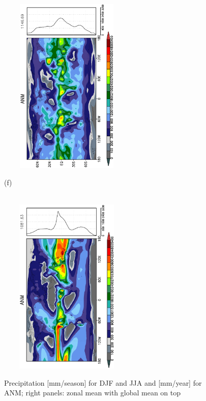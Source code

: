 \documentclass[12pt,a4paper,twoside,openright,headinclude,liststotoc,bibtotoc]{scrreprt}
\begin{document}
\begin{figure}[H]
{\includegraphics[height=8.5cm,width=6.5cm,angle=-90]
{eps/zonaltmtotalprec260.eps}
}
\parbox{8.5cm}{\hspace{0.45cm}\begin{scriptsize}(f)\end{scriptsize} \vspace{-0.7cm} \\
\includegraphics[height=8.5cm,width=6.5cm,angle=-90]
{eps/zonalt21tmtotalprec.eps}
}
\caption[Precipitation]{Precipitation [mm/season] for DJF and JJA and [mm/year] for ANM; right panels: zonal mean with global mean on top}
\label{img:totprec}
\end{figure}
\end{document}
